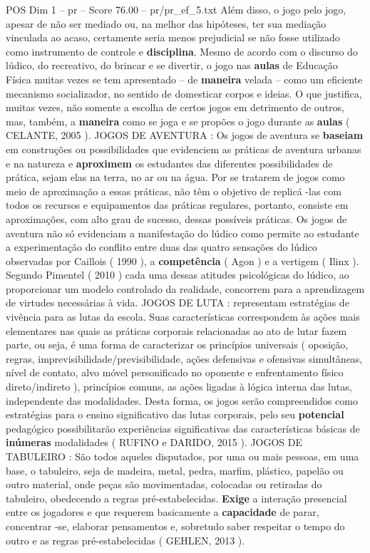 \begin{textsample}{POS Dim 1 – pr – Score 76.00 – pr/pr\_ef\_5.txt}
Além disso, o jogo pelo jogo, apesar de não ser mediado ou, na melhor das hipóteses, ter sua mediação vinculada ao acaso, certamente seria menos prejudicial se não fosse utilizado como instrumento de controle e \textbf{disciplina}.
Mesmo de acordo com o discurso do lúdico, do recreativo, do brincar e se divertir, o jogo nas \textbf{aulas} de Educação Física muitas vezes se tem apresentado – de \textbf{maneira} velada – como um eficiente mecanismo socializador, no sentido de domesticar corpos e ideias.
O que justifica, muitas vezes, não somente a escolha de certos jogos em detrimento de outros, mas, também, a \textbf{maneira} como se joga e se propões o jogo durante as \textbf{aulas} ( CELANTE, 2005 ).
JOGOS DE AVENTURA : Os jogos de aventura se \textbf{baseiam} em construções ou possibilidades que evidenciem as práticas de aventura urbanas e na natureza e \textbf{aproximem} os estudantes das diferentes possibilidades de prática, sejam elas na terra, no ar ou na água.
Por se tratarem de jogos como meio de aproximação a essas práticas, não têm o objetivo de replicá -las com todos os recursos e equipamentos das práticas regulares, portanto, consiste em aproximações, com alto grau de sucesso, dessas possíveis práticas.
Os jogos de aventura não só evidenciam a manifestação do lúdico como permite ao estudante a experimentação do conflito entre duas das quatro sensações do lúdico observadas por Caillois ( 1990 ), a \textbf{competência} ( Agon ) e a vertigem ( Ilinx ).
Segundo Pimentel ( 2010 ) cada uma dessas atitudes psicológicas do lúdico, ao proporcionar um modelo controlado da realidade, concorrem para a aprendizagem de virtudes necessárias à vida.
JOGOS DE LUTA : representam estratégias de vivência para as lutas da escola.
Suas características correspondem às ações mais elementares nas quais as práticas corporais relacionadas ao ato de lutar fazem parte, ou seja, é uma forma de caracterizar os princípios universais ( oposição, regras, imprevisibilidade/previsibilidade, ações defensivas e ofensivas simultâneas, nível de contato, alvo móvel personificado no oponente e enfrentamento físico direto/indireto ), princípios comuns, as ações ligadas à lógica interna das lutas, independente das modalidades.
Desta forma, os jogos serão compreendidos como estratégias para o ensino significativo das lutas corporais, pelo seu \textbf{potencial} pedagógico possibilitarão experiências significativas das características básicas de \textbf{inúmeras} modalidades ( RUFINO e DARIDO, 2015 ).
JOGOS DE TABULEIRO : São todos aqueles disputados, por uma ou mais pessoas, em uma base, o tabuleiro, seja de madeira, metal, pedra, marfim, plástico, papelão ou outro material, onde peças são movimentadas, colocadas ou retiradas do tabuleiro, obedecendo a regras pré-estabelecidas. \textbf{Exige} a interação presencial entre os jogadores e que requerem basicamente a \textbf{capacidade} de parar, concentrar -se, elaborar pensamentos e, sobretudo saber respeitar o tempo do outro e as regras pré-estabelecidas ( GEHLEN, 2013 ).

\end{textsample}
